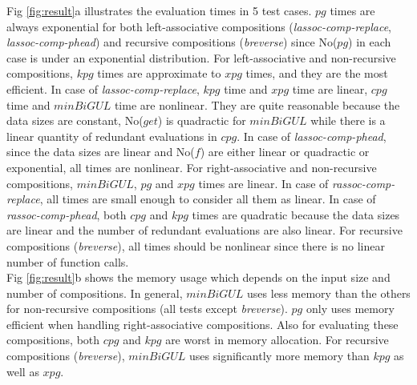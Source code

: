 %

Fig \ref{fig:result}a illustrates the evaluation times in 5 test cases. $pg$ times are always exponential for both left-associative compositions (\textit{lassoc-comp-replace}, \textit{lassoc-comp-phead}) and recursive compositions (\textit{breverse}) since No($pg$) in each case is under an exponential distribution. For left-associative and non-recursive compositions, $kpg$ times are approximate to $xpg$ times, and they are the most efficient. In case of \textit{lassoc-comp-replace}, $kpg$ time and $xpg$ time are linear, $cpg$ time and $minBiGUL$ time are nonlinear. They are quite reasonable because the data sizes are constant, No($get$) is quadractic for $minBiGUL$ while there is a linear quantity of redundant evaluations in $cpg$. In case of \textit{lassoc-comp-phead}, since the data sizes are linear and No($f$) are either linear or quadractic or exponential, all times are nonlinear. For right-associative and non-recursive compositions, $minBiGUL$, $pg$ and $xpg$ times are linear. In case of \textit{rassoc-comp-replace}, all times are small enough to consider all them as linear. In case of \textit{rassoc-comp-phead}, both $cpg$ and $kpg$ times are quadratic because the data sizes are linear and the number of redundant evaluations are also linear. For recursive compositions (\textit{breverse}), all times should be nonlinear since there is no linear number of function calls.\\
Fig \ref{fig:result}b shows the memory usage which depends on the input size and number of compositions. In general, $minBiGUL$ uses less memory than the others for non-recursive compositions (all tests except \textit{breverse}). $pg$ only uses memory efficient when handling right-associative compositions. Also for evaluating these  compositions, both $cpg$ and $kpg$ are worst in memory allocation. For recursive compositions (\textit{breverse}), $minBiGUL$ uses significantly more memory than $kpg$ as well as $xpg$.